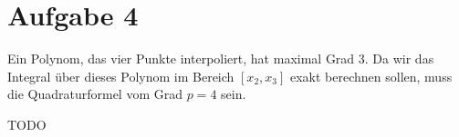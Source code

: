 \section*{Aufgabe 4}
Ein Polynom, das vier Punkte interpoliert, hat maximal Grad 3.
Da wir das Integral über dieses Polynom im Bereich $[x_2, x_3]$
exakt berechnen sollen, muss die Quadraturformel vom Grad $p=4$ sein.

TODO
